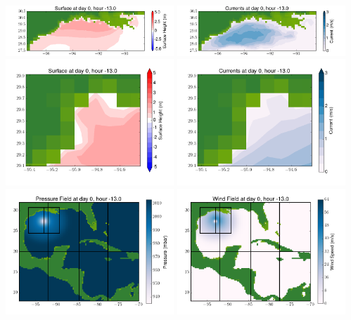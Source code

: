 \documentclass[11pt]{article}
\begin{document}
\includegraphics[width=0.475\textwidth]{frame0059fig4.png}
\vskip 10pt 
\includegraphics[width=0.475\textwidth]{frame0059fig5.png}
\includegraphics[width=0.475\textwidth]{frame0059fig6.png}
\vskip 10pt 
\includegraphics[width=0.475\textwidth]{frame0059fig7.png}
\includegraphics[width=0.475\textwidth]{frame0059fig8.png}
\vskip 10pt 
\includegraphics[width=0.475\textwidth]{frame0059fig9.png}
\end{document}
